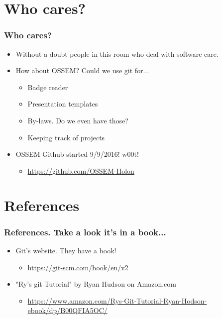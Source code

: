 \documentclass{beamer}
\begin{document}
\section{Who cares?}
\begin{frame}
    \frametitle{Who cares?}
    \begin{itemize}
        \item{Without a doubt people in this room who deal with software care.}
        \item{How about OSSEM? Could we use git for...}
            \begin{itemize}
                \item{Badge reader}
                \item{Presentation templates}
                \item{By-laws. Do we even have those?}
                \item{Keeping track of projects}
            \end{itemize}
        \item{OSSEM Github started 9/9/2016! w00t!}
            \begin{itemize}
                \item{\url{https://github.com/OSSEM-Holon}}
            \end{itemize}
    \end{itemize}
\end{frame}

\section{References}
\begin{frame}
    \frametitle{References. Take a look it's in a book...}
    \begin{itemize}
        \item{Git's website. They have a book!}
            \begin{itemize}
                \item{\url{https://git-scm.com/book/en/v2}}
            \end{itemize}
        \item{"Ry's git Tutorial" by Ryan Hudson on Amazon.com}
            \begin{itemize}
                \item{\url{https://www.amazon.com/Rys-Git-Tutorial-Ryan-Hodson-ebook/dp/B00QFIA5OC/}} 
            \end{itemize}
    \end{itemize}
\end{frame}
\end{document}
